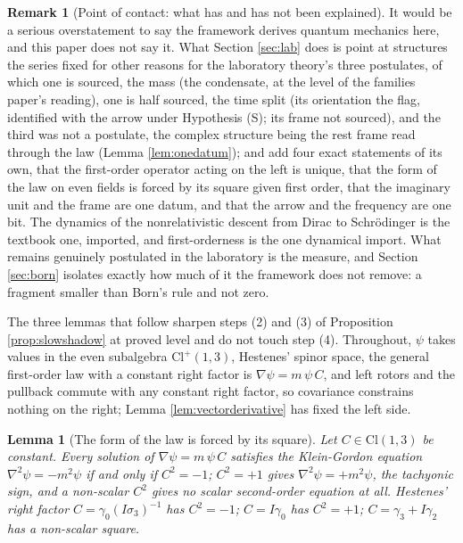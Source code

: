 \documentclass[11pt]{article}
\newtheorem{lemma}[theorem]{Lemma}
\theoremstyle{definition}
\newtheorem{remark}[theorem]{Remark}
\newcommand{\Cl}{\mathrm{Cl}}
\begin{document}
\begin{remark}[Point of contact: what has and has not been explained]\label{rem:labtouchpoint}
It would be a serious overstatement to say the framework derives quantum mechanics here, and this paper does not say it. What Section \ref{sec:lab} does is point at structures the series fixed for other reasons for the laboratory theory's three postulates, of which one is sourced, the mass (the condensate, at the level of the families paper's reading), one is half sourced, the time split (its orientation the flag, identified with the arrow under Hypothesis (S); its frame not sourced), and the third was not a postulate, the complex structure being the rest frame read through the law (Lemma \ref{lem:onedatum}); and add four exact statements of its own, that the first-order operator acting on the left is unique, that the form of the law on even fields is forced by its square given first order, that the imaginary unit and the frame are one datum, and that the arrow and the frequency are one bit. The dynamics of the nonrelativistic descent from Dirac to Schr\"odinger is the textbook one, imported, and first-orderness is the one dynamical import. What remains genuinely postulated in the laboratory is the measure, and Section \ref{sec:born} isolates exactly how much of it the framework does not remove: a fragment smaller than Born's rule and not zero.
\end{remark}


The three lemmas that follow sharpen steps (2) and (3) of Proposition \ref{prop:slowshadow} at proved level and do not touch step (4). Throughout, $\psi$ takes values in the even subalgebra $\Cl^{+}(1,3)$, Hestenes' spinor space, the general first-order law with a constant right factor is $\nabla\psi = m\,\psi\,C$, and left rotors and the pullback commute with any constant right factor, so covariance constrains nothing on the right; Lemma \ref{lem:vectorderivative} has fixed the left side.

\begin{lemma}[The form of the law is forced by its square]\label{lem:square}
Let $C \in \Cl(1,3)$ be constant. Every solution of $\nabla\psi = m\,\psi\,C$ satisfies the Klein-Gordon equation $\nabla^{2}\psi = -m^{2}\psi$ if and only if $C^{2} = -1$; $C^{2} = +1$ gives $\nabla^{2}\psi = +m^{2}\psi$, the tachyonic sign, and a non-scalar $C^{2}$ gives no scalar second-order equation at all. Hestenes' right factor $C = \gamma_{0}(I\sigma_{3})^{-1}$ has $C^{2} = -1$; $C = I\gamma_{0}$ has $C^{2} = +1$; $C = \gamma_{3} + I\gamma_{2}$ has a non-scalar square.
\end{lemma}
\end{document}
